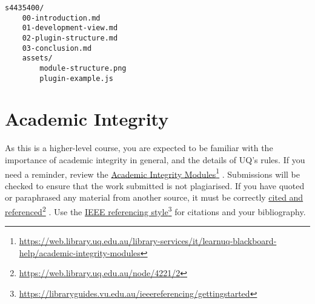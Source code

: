 \documentclass{csse4400}
\newcommand{\link}[2]{%
\href{#2}{#1}\footnote{\url{#2}}%
}
\begin{document}
\begin{verbatim}
s4435400/
    00-introduction.md
    01-development-view.md
    02-plugin-structure.md
    03-conclusion.md
    assets/
        module-structure.png
        plugin-example.js
\end{verbatim}

\section{Academic Integrity}
As this is a higher-level course, you are expected to be familiar with the importance of academic integrity in general, and the details of UQ's rules.
If you need a reminder, review the \link{Academic Integrity Modules}{https://web.library.uq.edu.au/library-services/it/learnuq-blackboard-help/academic-integrity-modules}.
Submissions will be checked to ensure that the work submitted is not plagiarised.
If you have quoted or paraphrased any material from another source, it must be correctly \link{cited and referenced}{https://web.library.uq.edu.au/node/4221/2}.
Use the \link{IEEE referencing style}{https://libraryguides.vu.edu.au/ieeereferencing/gettingstarted} for citations and your bibliography.



\end{document}
